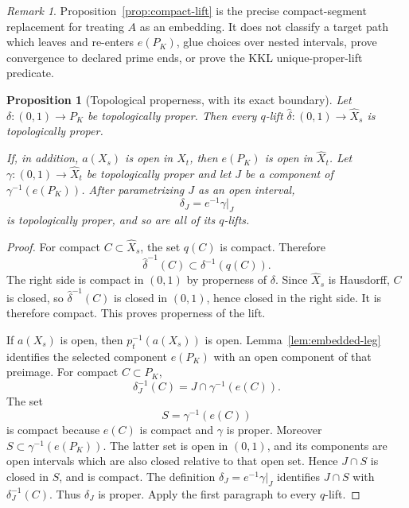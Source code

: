 \documentclass[11pt,reqno]{amsart}
\newtheorem{proposition}[theorem]{Proposition}
\theoremstyle{definition}
\theoremstyle{remark}
\newtheorem{remark}[theorem]{Remark}
\begin{document}
\begin{remark}
Proposition~\ref{prop:compact-lift} is the precise compact-segment
replacement for treating \( A \) as an embedding.  It does not
classify a target path which leaves and re-enters \( e(P_K) \), glue
choices over nested intervals, prove convergence to declared prime
ends, or prove the KKL unique-proper-lift predicate.
\end{remark}
\begin{proposition}[Topological properness, with its exact boundary]\label{prop:properness}
Let \( \delta\colon(0,1)\to P_K \) be topologically proper.  Then every \( q \)-lift \( \widehat\delta\colon(0,1)\to\widehat X_s \) is topologically proper.

If, in addition, \( a(X_s) \) is open in \( X_t \), then \( e(P_K) \) is open in \( \widehat X_t \).  Let \( \gamma\colon(0,1)\to\widehat X_t \) be topologically proper and let \( J \) be a component of \( \gamma^{-1}(e(P_K)) \).  After parametrizing \( J \) as an open interval,
\[
  \delta_J=e^{-1}\gamma|_J
\]
is topologically proper, and so are all of its \( q \)-lifts.
\end{proposition}

\begin{proof}
For compact \( C\subset\widehat X_s \), the set \( q(C) \) is compact.  Therefore
\[
  \widehat\delta^{-1}(C)\subset\delta^{-1}(q(C)).
\]
The right side is compact in \( (0,1) \) by properness of \( \delta \).  Since \( \widehat X_s \) is Hausdorff, \( C \) is closed, so \( \widehat\delta^{-1}(C) \) is closed in \( (0,1) \), hence closed in the right side.  It is therefore compact.  This proves properness of the lift.

If \( a(X_s) \) is open, then \( p_t^{-1}(a(X_s)) \) is open.  Lemma~\ref{lem:embedded-leg} identifies the selected component \( e(P_K) \) with an open component of that preimage.  For compact \( C\subset P_K \),
\[
  \delta_J^{-1}(C)=J\cap\gamma^{-1}(e(C)).
\]
The set
\[
  S=\gamma^{-1}(e(C))
\]
is compact because \( e(C) \) is compact and \( \gamma \) is proper.  Moreover \( S\subset\gamma^{-1}(e(P_K)) \).  The latter set is open in \( (0,1) \), and its components are open intervals which are also closed relative to that open set.  Hence \( J\cap S \) is closed in \( S \), and is compact.  The definition \( \delta_J=e^{-1}\gamma|_J \) identifies \( J\cap S \) with \( \delta_J^{-1}(C) \).  Thus \( \delta_J \) is proper.  Apply the first paragraph to every \( q \)-lift.
\end{proof}
\end{document}
